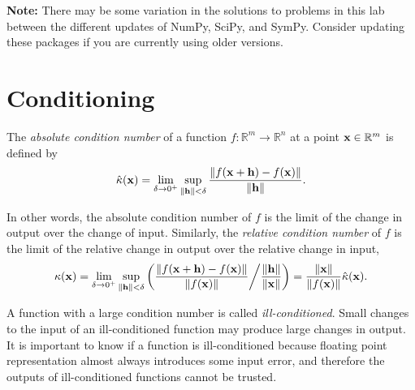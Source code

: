 
\noindent \textbf{ Note:} There may be some variation in the solutions to problems in this lab between the different updates of NumPy, SciPy, and SymPy.
Consider updating these packages if you are currently using older versions.
\section*{Conditioning} %

The \emph{absolute condition number} of a function $f: \mathbb{R}^m \rightarrow \mathbb{R}^n$ at a point $\mathbf{x}\in\mathbb{R}^m$ is defined by
\begin{equation}
\hat{\kappa} (\mathbf{x}) = \lim_{\delta \rightarrow 0^+} \sup_{\left\lVert\mathbf{h}\right\rVert < \delta} { \frac{\left\lVert f(\mathbf{x} + \mathbf{h} ) - f(\mathbf{x})\right\rVert}{\left\lVert\mathbf{h}\right\rVert} }.
\label{eq:absolute-condition-number}
\end{equation}

In other words, the absolute condition number of $f$ is the limit of the change in output over the change of input.
Similarly, the \emph{relative condition number} of $f$ is the limit of the relative change in output over the relative change in input,
\begin{equation}
\kappa(\mathbf{x})
= \lim_{\delta \rightarrow 0^+} \sup_{\left\lVert\mathbf{h}\right\rVert < \delta} \left({ \frac{\left\lVert f(\mathbf{x} + \mathbf{h} ) - f(\mathbf{x})\right\rVert}{\left\lVert f(\mathbf{x})\right\rVert} } \middle/ { \frac{\left\lVert\mathbf{h}\right\rVert}{\left\lVert\mathbf{x}\right\rVert} }\right)
= \frac{\left\lVert\mathbf{x}\right\rVert}{\left\lVert f(\mathbf{x})\right\rVert} \hat{\kappa}(\mathbf{x}).
\label{eq:relative-condition-number}
\end{equation}

A function with a large condition number is called \emph{ill-conditioned}.
Small changes to the input of an ill-conditioned function may produce large changes in output.
It is important to know if a function is ill-conditioned because floating point representation almost always introduces some input error, and therefore the outputs of ill-conditioned functions cannot be trusted.

